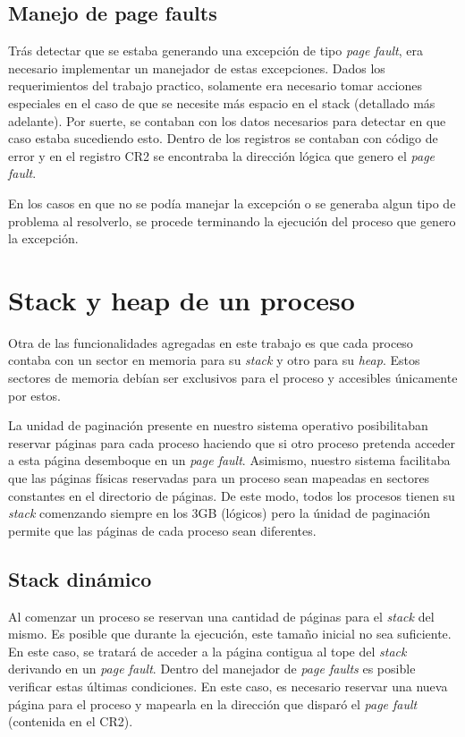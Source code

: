 \documentclass[a4paper,10pt]{article}
\begin{document}
\subsection{Manejo de page faults}

Trás detectar que se estaba generando una excepción de tipo \textit{page fault}, era necesario implementar un manejador de estas 
excepciones. Dados los requerimientos del trabajo practico, solamente era necesario tomar acciones especiales en el caso de que 
se necesite más espacio en el stack (detallado más adelante). Por suerte, se contaban con los datos necesarios para detectar en que 
caso estaba sucediendo esto. Dentro de los registros se contaban con código de error y en el registro CR2 se encontraba la dirección 
lógica que genero el \textit{page fault}.

En los casos en que no se podía manejar la excepción o se generaba algun tipo de problema al resolverlo, se procede terminando la 
ejecución del proceso que genero la excepción.

\newpage

\section{Stack y heap de un proceso}

Otra de las funcionalidades agregadas en este trabajo es que cada proceso contaba con un sector en memoria para su \textit{stack} y 
otro para su \textit{heap}. Estos sectores de memoria debían ser exclusivos para el proceso y accesibles únicamente por estos.

La unidad de paginación presente en nuestro sistema operativo posibilitaban reservar páginas para cada proceso haciendo que si otro 
proceso pretenda acceder a esta página desemboque en un \textit{page fault}. Asimismo, nuestro sistema facilitaba que las 
páginas físicas reservadas para un proceso sean mapeadas en sectores constantes en el directorio de páginas. De este modo, 
todos los procesos tienen su \textit{stack} comenzando siempre en los 3GB (lógicos) pero la únidad de paginación permite que las 
páginas de cada proceso sean diferentes.

\subsection{Stack dinámico}

Al comenzar un proceso se reservan una cantidad de páginas para el \textit{stack} del mismo. Es posible que durante la ejecución, 
este tamaño inicial no sea suficiente. En este caso, se tratará de acceder a la página contigua al tope del \textit{stack} derivando 
en un \textit{page fault}. Dentro del manejador de \textit{page faults} es posible verificar estas últimas condiciones. En este caso, 
es necesario reservar una nueva página para el proceso y mapearla en la dirección que disparó el \textit{page fault} (contenida en 
el CR2). 
\end{document}
